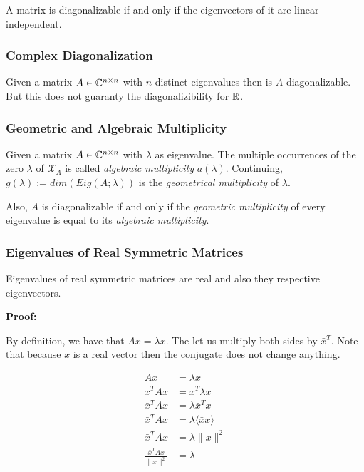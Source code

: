 A matrix is diagonalizable if and only if the eigenvectors of it are linear independent.

\subsubsection{Complex Diagonalization}

Given a matrix \(A \in \mathbb{C}^{n \times n}\) with \(n\) distinct eigenvalues then is \(A\)
diagonalizable. But this does not guaranty the diagonalizibility for \(\mathbb{R}\).

\subsubsection{Geometric and Algebraic Multiplicity}

Given a matrix \(A \in \mathbb{C}^{n \times n}\) with \(\lambda\) as eigenvalue. The multiple occurrences 
of the zero \(\lambda\) of \(\mathcal{X}_A\) is called \emph{algebraic multiplicity} \(a(\lambda)\). 
Continuing, \(g(\lambda):= dim(Eig(A;\lambda))\) is the \emph{geometrical multiplicity} of \(\lambda\).
\vspace{\baselineskip}

Also, \(A\) is diagonalizable if and only if the \emph{geometric multiplicity} of every eigenvalue is equal 
to its \emph{algebraic multiplicity}.

\subsubsection{Eigenvalues of Real Symmetric Matrices}

Eigenvalues of real symmetric matrices are real and also they respective eigenvectors.
\vspace{\baselineskip}

\textbf{Proof:}

By definition, we have that \(Ax = \lambda x\). The let us multiply both sides by \( \bar{x}^T\). Note 
that because \(x\) is a real vector then the conjugate does not change anything.

\begin{align*}
    Ax &= \lambda x \\
    \bar{x}^T A x &= \bar{x}^T \lambda x \\
    \bar{x}^T A x &= \lambda \bar{x}^T x \\
    \bar{x}^T A x &= \lambda \langle \bar{x} x \rangle\\
    \bar{x}^T A x &= \lambda \|x\|^2\\
    \frac{\bar{x}^T A x}{\|x\|^2} &= \lambda
\end{align*}

